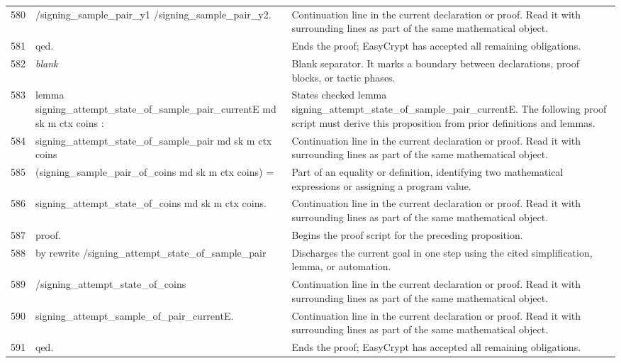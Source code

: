 \documentclass[10pt]{article}
\begin{document}
\begin{longtable}{r L{0.53\textwidth} L{0.37\textwidth}}
580 & {\ttfamily\scriptsize            /signing\_sample\_pair\_y1 /signing\_sample\_pair\_y2.} & Continuation line in the current declaration or proof.  Read it with surrounding lines as part of the same mathematical object. \\
581 & {\ttfamily\scriptsize qed.} & Ends the proof; EasyCrypt has accepted all remaining obligations. \\
582 & {\ttfamily\scriptsize \emph{blank}} & Blank separator.  It marks a boundary between declarations, proof blocks, or tactic phases. \\
583 & {\ttfamily\scriptsize lemma signing\_attempt\_state\_of\_sample\_pair\_currentE md sk m ctx coins :} & States checked lemma signing\_attempt\_state\_of\_sample\_pair\_currentE.  The following proof script must derive this proposition from prior definitions and lemmas. \\
584 & {\ttfamily\scriptsize   signing\_attempt\_state\_of\_sample\_pair md sk m ctx coins} & Continuation line in the current declaration or proof.  Read it with surrounding lines as part of the same mathematical object. \\
585 & {\ttfamily\scriptsize     (signing\_sample\_pair\_of\_coins md sk m ctx coins) =} & Part of an equality or definition, identifying two mathematical expressions or assigning a program value. \\
586 & {\ttfamily\scriptsize   signing\_attempt\_state\_of\_coins md sk m ctx coins.} & Continuation line in the current declaration or proof.  Read it with surrounding lines as part of the same mathematical object. \\
587 & {\ttfamily\scriptsize proof.} & Begins the proof script for the preceding proposition. \\
588 & {\ttfamily\scriptsize by rewrite /signing\_attempt\_state\_of\_sample\_pair} & Discharges the current goal in one step using the cited simplification, lemma, or automation. \\
589 & {\ttfamily\scriptsize            /signing\_attempt\_state\_of\_coins} & Continuation line in the current declaration or proof.  Read it with surrounding lines as part of the same mathematical object. \\
590 & {\ttfamily\scriptsize            signing\_attempt\_sample\_of\_pair\_currentE.} & Continuation line in the current declaration or proof.  Read it with surrounding lines as part of the same mathematical object. \\
591 & {\ttfamily\scriptsize qed.} & Ends the proof; EasyCrypt has accepted all remaining obligations. \\

\end{longtable}
\end{document}
